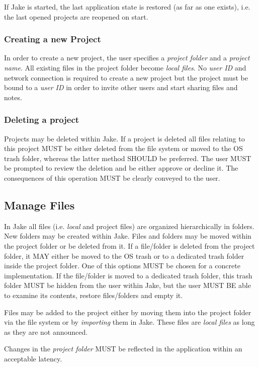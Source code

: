 If Jake is started, the last application state is restored (as far as one exists), i.e. the last opened projects are reopened on start.

\subsubsection{Creating a new Project}
In order to create a new project, the user specifies a \emph{project folder} and a \emph{project name}. All existing files in the project folder become \emph{local files}. No \emph{user ID} and network connection is required to create a new project but the project must be bound to a \emph{user ID} in order to invite other users and start sharing files and notes.

\subsubsection{Deleting a project}
Projects may be deleted within Jake. If a project is deleted all files relating to this project MUST be either deleted from the file system or moved to the OS trash folder, whereas the latter method SHOULD be preferred. The user MUST be prompted to review the deletion and be either approve or decline it. The consequences of this operation MUST be clearly conveyed to the user.

\subsection{Manage Files}
In Jake all files (i.e. \emph{local} and {project files}) are organized hierarchically in folders. New folders may be created within Jake. Files and folders may be moved within the project folder or be deleted from it. If a file/folder is deleted from the project folder, it MAY either be moved to the OS trash or to a dedicated trash folder inside the project folder. One of this options MUST be chosen for a concrete implementation. If the file/folder is moved to a dedicated trash folder, this trash folder MUST be hidden from the user within Jake, but the user MUST BE able to examine its contents, restore files/folders and empty it.

Files may be added to the project either by moving them into the project folder via the file system or by \emph{importing} them in Jake. These files are \emph{local files} as long as they are not announced.

Changes in the \emph{project folder} MUST be reflected in the application within an acceptable latency.

